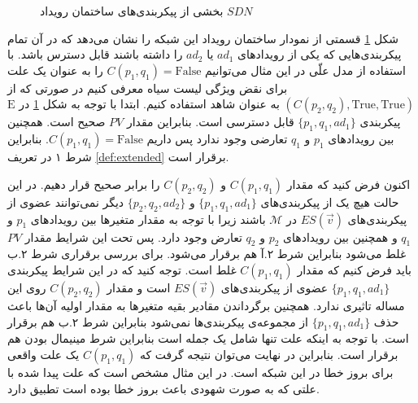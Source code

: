 \documentclass[
msc,
irfonts
]{./tex/tehran-thesis}
\newcommand{\پ}{پروژه/پایان‌نامه/رساله }
\theoremstyle{definition}
\theoremstyle{theorem}
\theoremstyle{definition}
\numberwithin{algorithm}{chapter}
\newcommand{\F}{\mathrm{False}}
\newcommand{\T}{\mathrm{True}}
\newcommand{\s}[1]{\{#1\}}
\newcommand{\crd}[4][above]{
    \node[draw,circle,inner sep=2pt,fill,label={[#1]:#4}] at (#2,#3) {};
}
\newcommand{\mc}[1]{\mathcal{#1}}
\newcommand{\mr}[1]{\mathrm{#1}}
\begin{document}
\begin{figure}
    \centering
    \caption{
        بخشی از پیکربندی‌های 
        ساختمان رویداد
        $SDN$
    }
    \label{fig:blacklist:es}
\end{figure}

شکل
\ref{fig:blacklist:es}
قسمتی از نمودار ساختمان رویداد این شبکه را نشان می‌دهد که در آن تمام پیکر‌بندی‌هایی که یکی از رویداد‌های 
$ad_1$
یا
$ad_2$
را داشته باشند
قابل دسترس باشد.
با استفاده از مدل علّی در این مثال می‌توانیم
$C(p_1,q_1) = \F$
را به عنوان یک علت برای نقض ویژگی لیست سیاه معرفی کنیم در صورتی که از
$(C(p_2,q_2),\T,\T)$
به عنوان شاهد استفاده کنیم.
ابتدا با توجه به شکل
\ref{fig:blacklist:es}
در 
$\mr{E}$
پیکربندی 
$\s{p_1,q_1,ad_1}$
قابل دسترسی است.
بنابراین مقدار
$PV$
صحیح است.
همچنین بین رویداد‌های 
$p_1$
و
$q_1$
تعارضی وجود ندارد پس داریم
$C(p_1,q_1) = \F$.
بنابراین شرط ۱ در تعریف 
\ref{def:extended}
برقرار است.

اکنون فرض کنید که مقدار
$C(p_1,q_1)$
و
$C(p_2,q_2)$
را برابر صحیح قرار دهیم.
در این حالت هیچ یک از پیکر‌بندی‌های 
$\s{p_1,q_1,ad_1}$
و
$\s{p_2,q_2,ad_2}$
دیگر نمی‌توانند عضوی از پیکربندی‌های 
$ES(\vec v)$
در 
$\mc{M}$
باشند زیرا با توجه به مقدار متغیر‌ها
بین روید‌اد‌های 
$p_1$
و
$q_1$
و همچنین بین رویداد‌های 
$p_2$
و
$q_2$
تعارض وجود دارد.
پس تحت این شرایط مقدار
$PV$
غلط می‌شود بنابراین شرط 
۲.آ هم برقرار می‌شود.
برای بررسی برقراری شرط ۲.ب
باید فرض کنیم که مقدار
$C(p_1,q_1)$
غلط است.
توجه کنید که در این شرایط پیکربندی
$\s{p_1,q_1,ad_1}$
عضوی از پیکربندی‌های 
$ES(\vec v)$
است و مقدار
$C(p_2,q_2)$
روی این مساله تاثیری ندارد.
همچنین برگرداندن مقادیر بقیه متغیر‌ها به مقدار اولیه آن‌ها باعث حذف 
$\s{p_1,q_1,ad_1}$
از مجموعه‌ی پیکربندی‌ها نمی‌شود بنابراین شرط ۲.ب هم برقرار است.
با توجه به اینکه علت تنها شامل یک جمله است بنابراین شرط مینیمال بودن هم برقرار است.
بنابراین در نهایت می‌توان نتیجه گرفت که 
$C(p_1,q_1)$
یک علت واقعی برای بروز خطا در این شبکه است.
در این مثال مشخص است که علت پیدا شده با علتی که به صورت شهودی باعث بروز خطا بوده است تطبیق دارد.
\end{document}
